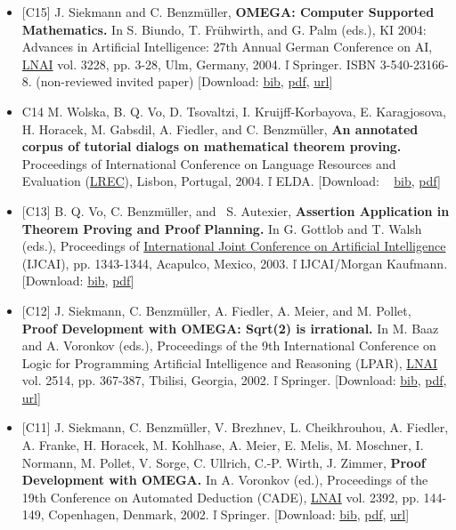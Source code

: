 \documentclass{article}
\newcommand{\tmtextbf}[1]{{\bfseries{#1}}}
\newenvironment{itemizedot}{\begin{itemize} \renewcommand{\labelitemi}{$\bullet$}\renewcommand{\labelitemii}{$\bullet$}\renewcommand{\labelitemiii}{$\bullet$}\renewcommand{\labelitemiv}{$\bullet$}}{\end{itemize}}
\begin{document}
\begin{itemizedot}
  \item {\small [C15] J. Siekmann and C. Benzm\"uller, \tmtextbf{OMEGA:
  Computer Supported Mathematics.}} In S. Biundo, T. Fr\"uhwirth, and G. Palm
  (eds.), KI 2004: Advances in Artificial Intelligence: 27th Annual German
  Conference on AI, \href{http://www.springer.de/comp/lncs/}{LNAI} vol. 3228,
  pp. 3-28, Ulm, Germany, 2004.  \v{l}  Springer. ISBN 3-540-23166-8.
  (non-reviewed invited paper) {\color{grey} [Download: {\small
  \href{../papers/C15.bib}{bib}, \href{../papers/C15.pdf}{pdf}}, {\small
  \href{http://springerlink.metapress.com/openurl.asp?genre=article\&issn=0302-9743\&volume=3238\&spage=3}{url}}]}
  
  \item [C14] M. Wolska, B. Q. Vo, D. Tsovaltzi, I. Kruijff-Korbayova, E.
  Karagjosova, H. Horacek, M. Gabsdil, A. Fiedler, and C. Benzm\"uller,
  \tmtextbf{An annotated corpus of tutorial dialogs on mathematical theorem
  proving.} Proceedings of International Conference on Language Resources and
  Evaluation (\href{http://www.lrec-conf.org/lrec2004}{LREC}), Lisbon,
  Portugal, 2004.  \v{l}  ELDA. {\color{grey} [Download: \ {\small
  \href{../papers/C14.bib}{bib}, \href{../papers/C14.pdf}{pdf}}]}
  
  \item {\small [C13] B. Q. Vo, C. Benzm\"uller, and \ S. Autexier,
  \tmtextbf{Assertion Application in Theorem Proving and Proof Planning.} In
  G. Gottlob and T. Walsh (eds.), Proceedings of
  \href{http://ijcai.org/}{International Joint Conference on Artificial
  Intelligence} (IJCAI), pp. 1343-1344, Acapulco, Mexico, 2003.  \v{l}
  }{\small IJCAI/Morgan Kaufmann.} {\color{grey} [Download: {\small
  \href{../papers/C13.bib}{bib}, \href{../papers/C13.pdf}{pdf}}]}
  
  \item {\small [C12] J. Siekmann, C. Benzm\"uller, A. Fiedler, A. Meier, and
  M. Pollet, \tmtextbf{Proof Development with OMEGA: Sqrt(2) is irrational.}}
  {\small In M. Baaz and A. Voronkov (eds.), Proceedings of the 9th
  International Conference on Logic for Programming Artificial Intelligence
  and Reasoning (LPAR), \href{http://www.springer.de/comp/lncs/}{LNAI} vol.
  2514, pp. 367-387, Tbilisi, Georgia, 2002.  \v{l}  Springer.} {\color{grey}
  [Download: {\small \href{../papers/C12.bib}{bib},
  \href{../papers/C12.pdf}{pdf}}, {\small
  \href{http://link.springer.de/link/service/series/0558/bibs/2514/25140367.htm}{url}}]}
  
  \item {\small [C11] J. Siekmann, C. Benzm\"uller, V. Brezhnev, L.
  Cheikhrouhou, A. Fiedler, A. Franke, H. Horacek, M. Kohlhase, A. Meier, E.
  Melis, M. Moschner, I. Normann, M. Pollet, V. Sorge, C. Ullrich, C.-P.
  Wirth, J. Zimmer, \tmtextbf{Proof Development with OMEGA.}} {\small In A.
  Voronkov (ed.), Proceedings of the 19th Conference on Automated Deduction
  (CADE), \href{http://www.springer.de/comp/lncs/}{ LNAI} vol. 2392, pp.
  144-149, Copenhagen, Denmark, 2002.  \v{l}  Springer.} {\color{grey}
  [Download: {\small \href{../papers/C11.bib}{bib},
  \href{../papers/C11.pdf}{pdf}}, {\small
  \href{http://link.springer.de/link/service/series/0558/bibs/2392/23920144.htm}{url}}]}
  

\end{itemizedot}
\end{document}

